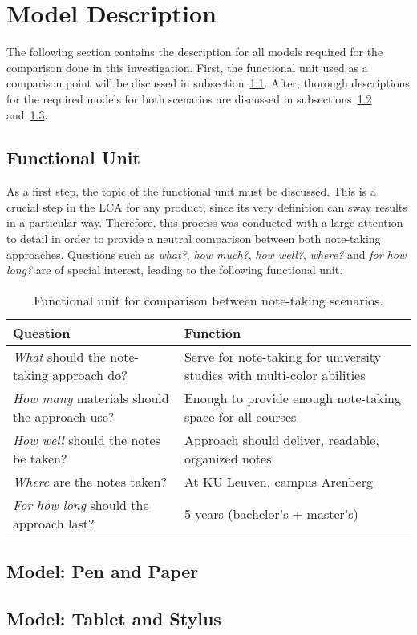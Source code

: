 \section{Model Description}\label{sec:model_description}
The following section contains the description for all models required for the comparison done in this investigation. First, the functional unit used as a comparison point will be discussed in subsection~\ref{subsec:functional_unit}. After, thorough descriptions for the required models for both scenarios are discussed in subsections~\ref{subsec:model_pen_paper} and~\ref{subsec:model_tablet_stylus}.


\subsection{Functional Unit}\label{subsec:functional_unit}
As a first step, the topic of the functional unit must be discussed. This is a crucial step in the LCA for any product, since its very definition can sway results in a particular way. Therefore, this process was conducted with a large attention to detail in order to provide a neutral comparison between both note-taking approaches. Questions such as \textit{what?}, \textit{how much?}, \textit{how well?}, \textit{where?} and \textit{for how long?} are of special interest, leading to the following functional unit.

\renewcommand{\arraystretch}{1.5}
\begin{table}[H]
    \centering
    \begin{tabular}{M{0.4\textwidth}|M{0.5\textwidth}}
        Question & Function \\
        \hline
        \hline
        \textit{What} should the note-taking approach do?            &   Serve for note-taking for university studies with multi-color abilities\\
        \hline
        \textit{How many} materials should the approach use?         &   Enough to provide enough note-taking space for all courses\\
        \hline
        \textit{How well} should the notes be taken?                 &   Approach should deliver, readable, organized notes\\
        \hline
        \textit{Where} are the notes taken?                          &   At KU Leuven, campus Arenberg\\
        \hline
        \textit{For how long} should the approach last?              &   5 years (bachelor's + master's)
    \end{tabular}
    \caption{Functional unit for comparison between note-taking scenarios.}
    \label{tab:functional_unit}
\end{table}
\renewcommand{\arraystretch}{1}

\subsection{Model: Pen and Paper}\label{subsec:model_pen_paper}


\subsection{Model: Tablet and Stylus}\label{subsec:model_tablet_stylus}